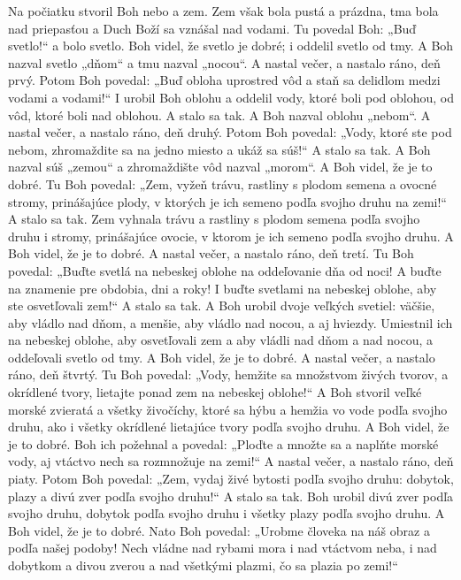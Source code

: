 Na počiatku stvoril Boh nebo a zem. 
Zem však bola pustá a prázdna, tma bola nad priepasťou a Duch Boží sa vznášal nad vodami.
\versseparator
Tu povedal Boh: „Buď svetlo!“ a bolo svetlo. 
Boh videl, že svetlo je dobré; i oddelil svetlo od tmy. A Boh nazval svetlo „dňom“ a tmu nazval „nocou“. A nastal večer, a nastalo ráno, deň prvý.
\versseparator
Potom Boh povedal: „Buď obloha uprostred vôd a staň sa delidlom medzi vodami a vodami!“ I urobil Boh oblohu a oddelil vody, ktoré boli pod oblohou, od vôd, ktoré boli nad oblohou. A stalo sa tak. A Boh nazval oblohu „nebom“. A nastal večer, a nastalo ráno, deň druhý.
\versseparator
Potom Boh povedal: „Vody, ktoré ste pod nebom, zhromaždite sa na jedno miesto a ukáž sa súš!“ A stalo sa tak. A Boh nazval súš „zemou“ a zhromaždište vôd nazval „morom“. A Boh videl, že je to dobré. Tu Boh povedal: „Zem, vyžeň trávu, rastliny s plodom semena a ovocné stromy, prinášajúce plody, v ktorých je ich semeno podľa svojho druhu na zemi!“ A stalo sa tak. Zem vyhnala trávu a rastliny s plodom semena podľa svojho druhu i stromy, prinášajúce ovocie, v ktorom je ich semeno podľa svojho druhu. A Boh videl, že je to dobré. A nastal večer, a nastalo ráno, deň tretí.
\versseparator
Tu Boh povedal: „Buďte svetlá na nebeskej oblohe na oddeľovanie dňa od noci! A buďte na znamenie pre obdobia, dni a roky! I buďte svetlami na nebeskej oblohe, aby ste osvetľovali zem!“ A stalo sa tak. A Boh urobil dvoje veľkých svetiel: väčšie, aby vládlo nad dňom, a menšie, aby vládlo nad nocou, a aj hviezdy. Umiestnil ich na nebeskej oblohe, aby osvetľovali zem a aby vládli nad dňom a nad nocou, a oddeľovali svetlo od tmy. A Boh videl, že je to dobré. A nastal večer, a nastalo ráno, deň štvrtý.
\versseparator
Tu Boh povedal: „Vody, hemžite sa množstvom živých tvorov, a okrídlené tvory, lietajte ponad zem na nebeskej oblohe!“ A Boh stvoril veľké morské zvieratá a všetky živočíchy, ktoré sa hýbu a hemžia vo vode podľa svojho druhu, ako i všetky okrídlené lietajúce tvory podľa svojho druhu. A Boh videl, že je to dobré. Boh ich požehnal a povedal: „Ploďte a množte sa a naplňte morské vody, aj vtáctvo nech sa rozmnožuje na zemi!“ A nastal večer, a nastalo ráno, deň piaty.
\versseparator
Potom Boh povedal: „Zem, vydaj živé bytosti podľa svojho druhu: dobytok, plazy a divú zver podľa svojho druhu!“ A stalo sa tak. Boh urobil divú zver podľa svojho druhu, dobytok podľa svojho druhu i všetky plazy podľa svojho druhu. A Boh videl, že je to dobré.
\versseparator
Nato Boh povedal: „Urobme človeka na náš obraz a podľa našej podoby! Nech vládne nad rybami mora i nad vtáctvom neba, i nad dobytkom a divou zverou a nad všetkými plazmi, čo sa plazia po zemi!“

